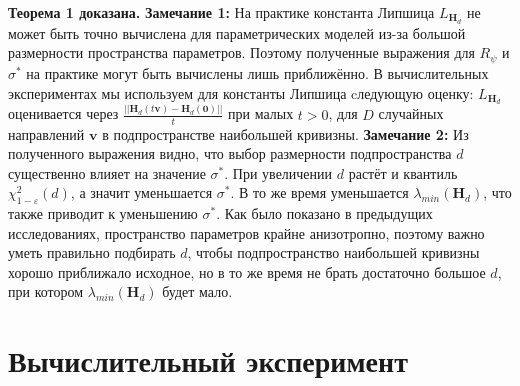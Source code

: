 \documentclass[11pt,a4paper]{article}
\begin{document}
\textbf{Теорема 1 доказана.}\newline
\textbf{Замечание 1:} На практике константа Липшица $L_{\mathbf{H}_d}$ не может быть точно вычислена для параметрических моделей из-за большой размерности пространства параметров. Поэтому полученные выражения для $R_{\psi}$ и $\sigma^{*}$ на практике могут быть вычислены лишь приближённо. \newline
В вычислительных экспериментах мы используем для константы Липшица cледующую оценку: 
$L_{\mathbf{H}_d}$ оценивается через $\frac{||\mathbf{H}_d(t\mathbf{v}) - \mathbf{H}_d(\mathbf{0})||}{t}$ при малых $t > 0$, для $D$ случайных направлений $\mathbf{v}$ в подпространстве наибольшей кривизны. \newline
\textbf{Замечание 2:}
Из полученного выражения видно, что выбор размерности подпространства $d$ существенно влияет на значение $\sigma^{*}$. При увеличении $d$ растёт и квантиль $\chi^2_{1-\varepsilon}(d)$, а значит уменьшается $\sigma^{*}$. В то же время уменьшается $\lambda_{min}(\mathbf{H}_d)$, что также приводит к уменьшению $\sigma^{*}$. Как было показано в предыдущих исследованиях, пространство параметров крайне анизотропно, поэтому важно уметь правильно подбирать $d$, чтобы подпространство наибольшей кривизны хорошо приближало исходное, но в то же время не брать достаточно большое $d$, при котором $\lambda_{min}(\mathbf{H}_d)$ будет мало.
\section{Вычислительный эксперимент}




\end{document}
